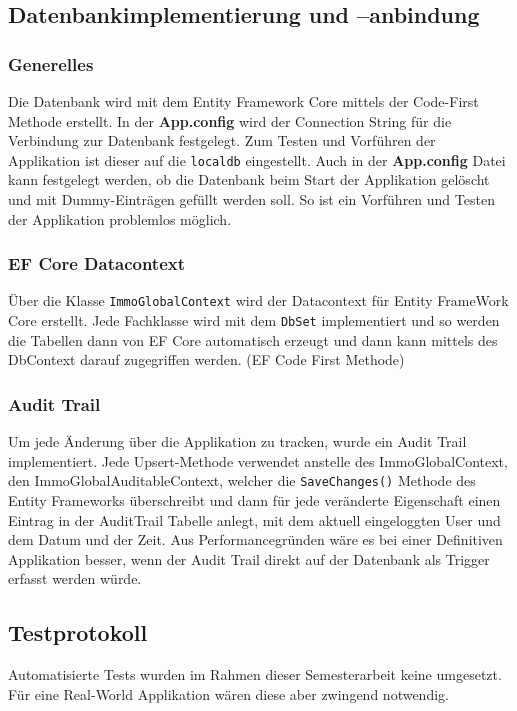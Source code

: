 \newpage
\subsection{Datenbankimplementierung und –anbindung}
\subsubsection{Generelles}
Die Datenbank wird mit dem Entity Framework Core mittels der Code-First Methode erstellt. In der \textbf{App.config} wird der Connection String für die Verbindung zur Datenbank festgelegt. Zum Testen und Vorführen der Applikation ist dieser auf die \verb+localdb+ eingestellt. Auch in der \textbf{App.config} Datei kann festgelegt werden, ob die Datenbank beim Start der Applikation gelöscht und mit Dummy-Einträgen gefüllt werden soll. So ist ein Vorführen und Testen der Applikation problemlos möglich.

\subsubsection{EF Core Datacontext}
Über die Klasse \verb+ImmoGlobalContext+  wird der Datacontext für Entity FrameWork Core erstellt. Jede Fachklasse wird mit dem \verb+DbSet+ implementiert und so werden die Tabellen dann von EF Core automatisch erzeugt und dann kann mittels des DbContext darauf zugegriffen werden. (EF Code First Methode)

\subsubsection{Audit Trail}
Um jede Änderung über die Applikation zu tracken, wurde ein Audit Trail implementiert. Jede Upsert-Methode verwendet anstelle des ImmoGlobalContext, den ImmoGlobalAuditableContext, welcher die \verb+SaveChanges()+ Methode des Entity Frameworks überschreibt und dann für jede veränderte Eigenschaft einen Eintrag in der AuditTrail Tabelle anlegt, mit dem aktuell eingeloggten User und dem Datum und der Zeit.
Aus Performancegründen wäre es bei einer Definitiven Applikation besser, wenn der Audit Trail direkt auf der Datenbank als Trigger erfasst werden würde.

\newpage
\subsection{Testprotokoll}
Automatisierte Tests wurden im Rahmen dieser Semesterarbeit keine umgesetzt. Für eine Real-World Applikation wären diese aber zwingend notwendig.

